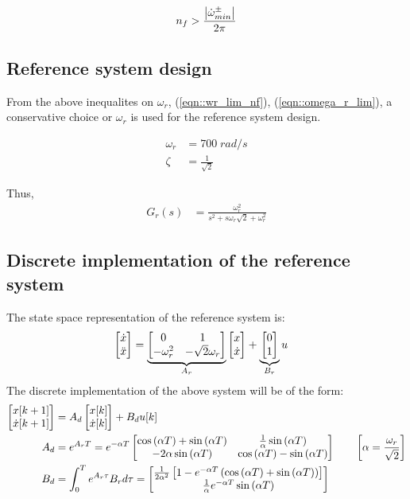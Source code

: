 \begin{align}
    n_f > \frac{\left\lvert \dot \omega^{\pm}_{min} \right\rvert}{2 \pi}
\end{align}



\subsection{Reference system design}
From the above inequalites on $\omega_r$, (\ref{eqn::wr_lim_nf}),
(\ref{eqn::omega_r_lim}), a conservative choice or $\omega_r$ is used for the
reference system design.

\begin{align}
    \omega_r &= 700 \; rad/s\\
    \zeta &= \frac{1}{\sqrt{2}}
\end{align}

Thus,
\begin{align}
    G_r (s) &= \frac{\omega_r^2}{s^2 + s \omega_r \sqrt{2}  + \omega_r^2}
\end{align}


\subsection{Discrete implementation of the reference system}

The state space representation of the reference system is:
\begin{align}
    \begin{bmatrix} \dot x \\ \ddot x \end{bmatrix} &= \underbrace{\begin{bmatrix} 0 & 1 \\ -\omega_r^2 & -\sqrt{2} \omega_r \end{bmatrix}}_{A_r} \begin{bmatrix} x \\ \dot x \end{bmatrix} + \underbrace{\begin{bmatrix} 0 \\ 1 \end{bmatrix}}_{B_r} u
\end{align}
The discrete implementation of the above system will be of the form:
\begin{align}
    \begin{bmatrix} x[k+1] \\ \dot x[k+1] \end{bmatrix} &= A_d \begin{bmatrix} x[k] \\ \dot x[k] \end{bmatrix} + B_d u[k]\\
    A_d &= e^{A_r T} =
    e^{-\alpha T} \begin{bmatrix} \cos \left( \alpha T \right) + \sin \left( \alpha T \right) & \frac{1}{\alpha}
                        \sin \left( \alpha T \right)\\
                       -2 \alpha \sin \left( \alpha T \right) & \cos \left( \alpha T \right) - \sin \left( \alpha T \right) \end{bmatrix}
    \qquad \left[ \alpha = \frac{\omega_r}{\sqrt{2}} \right]\\
    B_d &= \int_0^T e^{A_r \tau} B_r d\tau = \begin{bmatrix} \frac{1}{2 \alpha^2} \left[ 1 - e^{-\alpha T} \left( \cos \left( \alpha T \right) + \sin \left( \alpha T \right) \right) \right] \\
    \frac{1}{\alpha} e^{-\alpha T} \sin \left( \alpha T \right) \end{bmatrix}
\end{align}

